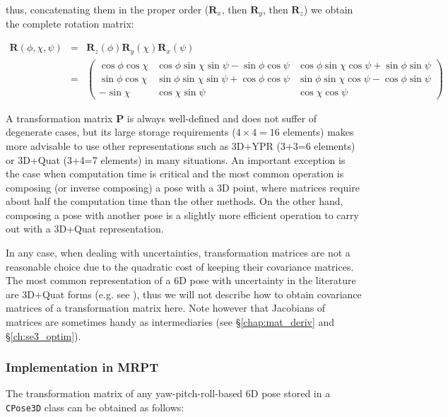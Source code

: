 \documentclass[a4paper,11pt]{report}
\begin{document}
\noindent thus, concatenating them in the proper order ($\mathbf{R}_x$, then $\mathbf{R}_y$, then $\mathbf{R}_z$)
we obtain the complete rotation matrix:

\begin{eqnarray}
\mathbf{R}(\phi,\chi,\psi) &=&  \mathbf{R}_z(\phi) \mathbf{R}_y(\chi) \mathbf{R}_x(\psi)
\label{eq:mat_ypr} \\
&=&
\left(
\begin{array}{ccc}
\cos \phi \cos \chi  & \cos \phi \sin \chi \sin \psi - \sin \phi \cos \psi   & \cos \phi \sin \chi \cos \psi + \sin \phi \sin \psi \\
\sin \phi \cos \chi  & \sin \phi \sin \chi \sin \psi + \cos \phi \cos \psi  &  \sin \phi \sin \chi \cos \psi - \cos \phi \sin \psi \\
-\sin \chi & \cos \chi \sin \psi  &  \cos \chi \cos \psi
\end{array}
\right) \nonumber
\end{eqnarray}

A transformation matrix $\mathbf{P}$ is always well-defined and does not suffer of degenerate cases, but its large
storage requirements ($4\times 4=16$ elements) makes more advisable to use other representations such
as 3D+YPR (3+3=6 elements) or 3D+Quat (3+4=7 elements) in many situations.
An important exception is the case when computation time is critical and the most common operation
is composing (or inverse composing) a pose with a 3D point, where matrices require about half the
computation time than the other methods. On the other hand, composing a pose with another pose is
a slightly more efficient operation to carry out with a 3D+Quat representation.

In any case, when dealing with uncertainties, transformation matrices are not a
reasonable choice due to the
quadratic cost of keeping their covariance matrices.
The most common representation of a 6D pose with uncertainty in the literature
are 3D+Quat forms (e.g. see \cite{davison2007mrt}), thus
we will not describe how to
obtain covariance matrices of a transformation matrix here.
Note however that Jacobians of matrices are sometimes handy
as intermediaries (see \S\ref{chap:mat_deriv} and \S\ref{ch:se3_optim}).


\subsubsection{Implementation in MRPT}

The transformation matrix of any yaw-pitch-roll-based 6D pose stored in a
\texttt{CPose3D} class can be obtained as follows:
\end{document}
